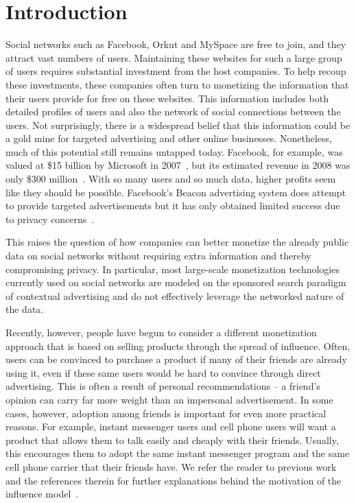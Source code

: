 \documentclass[letterpaper,twoside]{article}
\begin{document}
\section{Introduction}
Social networks such as Facebook, Orkut and MySpace are free to join, and
they attract vast numbers of users. Maintaining these websites
for such a large group of users requires substantial investment from the host
companies.  To help recoup these investments, these companies often turn to
monetizing the information that their users provide for free on these
websites. This information includes both detailed profiles of users and also
the network of social connections between the users.  Not surprisingly, there
is a widespread belief that this information could be a gold mine for
targeted advertising and other online businesses.  Nonetheless, much of this
potential still remains untapped today. Facebook, for example, was valued at
\$15 billion by Microsoft in 2007~\cite{BBC07}, but its estimated revenue in
2008 was only \$300 million~\cite{Wikipedia:Facebook}. With so many users and so
much data, higher profits seem like they should be possible.  Facebook's
Beacon advertising system does attempt to provide targeted advertisements but
it has only obtained limited success due to privacy
concerns~\cite{Wikipedia:Beacon}.

This raises the question of how companies can better monetize the already public
data on social networks without requiring extra information and thereby compromising
privacy. In particular, most large-scale monetization technologies
currently used on social networks are modeled on the sponsored search paradigm of
contextual advertising and do not effectively leverage the networked nature of the data.

Recently, however, people have begun to consider a different monetization
approach that is based on selling products through the spread of
influence. Often, users can be convinced to purchase a product if many of
their friends are already using it, even if these same users would be hard to
convince through direct advertising. This is often a result of personal
recommendations -- a friend's opinion can carry far more weight than an
impersonal advertisement. In some cases, however, adoption among friends is
important for even more practical reasons. For example, instant messenger
users and cell phone users will want a product that allows them to talk
easily and cheaply with their friends.  Usually, this encourages them to
adopt the same instant messenger program and the same cell phone carrier that
their friends have.  We refer the reader to previous work and the references
therein for further explanations behind the motivation of the influence
model~\cite{Kleinberg_AGT07,HMS08}.
\end{document}
